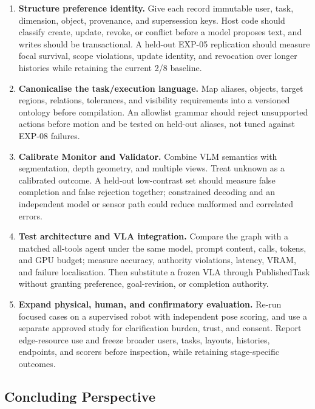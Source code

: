 \documentclass{article}
\begin{document}
\begin{enumerate}
    \setlength{\itemsep}{2pt}
    \setlength{\parsep}{0pt}
    \item \textbf{Structure preference identity.} Give each record immutable
    user, task, dimension, object, provenance, and supersession keys. Host code
    should classify create, update, revoke, or conflict before a model proposes
    text, and writes should be transactional. A held-out EXP-05 replication
    should measure focal survival, scope violations, update identity, and
    revocation over longer histories while retaining the current 2/8 baseline.

    \item \textbf{Canonicalise the task/execution language.} Map aliases,
    objects, target regions, relations, tolerances, and visibility requirements
    into a versioned ontology before compilation. An allowlist grammar should
    reject unsupported actions before motion and be tested on held-out aliases,
    not tuned against EXP-08 failures.

    \item \textbf{Calibrate Monitor and Validator.} Combine VLM semantics with
    segmentation, depth geometry, and multiple views. Treat unknown as a
    calibrated outcome. A held-out low-contrast set should measure false
    completion and false rejection together; constrained decoding and an
    independent model or sensor path could reduce malformed and correlated
    errors.

    \item \textbf{Test architecture and VLA integration.} Compare the graph
    with a matched all-tools agent under the same model, prompt content, calls,
    tokens, and GPU budget; measure accuracy, authority violations, latency,
    VRAM, and failure localisation. Then substitute a frozen VLA through
    PublishedTask without granting preference, goal-revision, or completion
    authority.

    \item \textbf{Expand physical, human, and confirmatory evaluation.} Re-run
    focused cases on a supervised robot with independent pose scoring, and use a
    separate approved study for clarification burden, trust, and consent.
    Report edge-resource use and freeze broader users, tasks, layouts, histories,
    endpoints, and scorers before inspection, while retaining stage-specific
    outcomes.
\end{enumerate}

\subsection{Concluding Perspective}
\label{subsec:discussion-conclusion}
\end{document}
